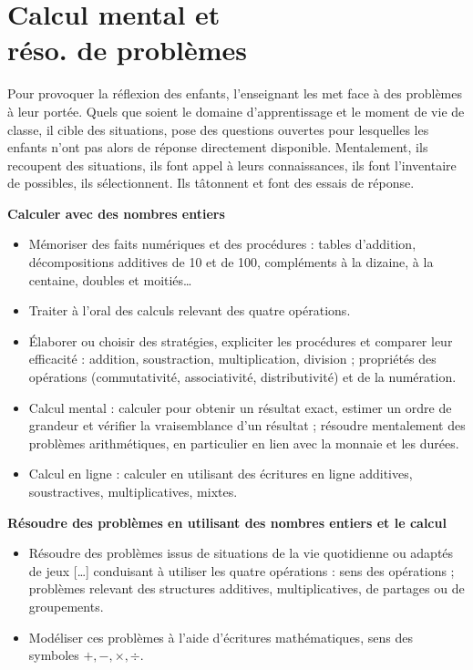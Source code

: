 \chapter{Calcul mental et\\réso. de problèmes} \label{Num2}

\begin{prerequis}
   Pour provoquer la réflexion des enfants, l’enseignant les met face à des problèmes à leur portée. Quels que soient le domaine d’apprentissage et le moment de vie de classe, il cible des situations, pose des questions ouvertes pour lesquelles les enfants n’ont pas alors de réponse directement disponible. Mentalement, ils recoupent des situations, ils font appel à leurs connaissances, ils font l’inventaire de possibles, ils sélectionnent. Ils tâtonnent et font des essais de réponse.
\end{prerequis}

\begin{prerequis}
{\bf Calculer avec des nombres entiers}
   \begin{itemize}
      \item Mémoriser des faits numériques et des procédures : tables d'addition, décompositions additives de 10 et de 100, compléments à la dizaine, à la centaine, doubles et moitiés\dots
      \item Traiter à l’oral des calculs relevant des quatre opérations.
      \item Élaborer ou choisir des stratégies, expliciter les procédures et comparer leur efficacité : addition, soustraction, multiplication, division ; propriétés des opérations (commutativité, associativité, distributivité) et de la numération.
      \item Calcul mental : calculer pour obtenir un résultat exact, estimer un ordre de grandeur et vérifier la vraisemblance d’un résultat ; résoudre mentalement des problèmes arithmétiques, en particulier en lien avec la monnaie et les durées.
      \item Calcul en ligne : calculer en utilisant des écritures en ligne additives, soustractives, multiplicatives, mixtes.
   \end{itemize}
{\bf Résoudre des problèmes en utilisant des nombres entiers et le calcul}
   \begin{itemize}
      \item Résoudre des problèmes issus de situations de la vie quotidienne ou adaptés de jeux [\dots] conduisant à utiliser les quatre opérations : sens des opérations ; problèmes relevant des structures additives, multiplicatives, de partages ou de groupements.
      \item Modéliser ces problèmes à l’aide d’écritures mathématiques, sens des symboles $+, -, \times, \div$.
    \end{itemize}
\end{prerequis}
  
